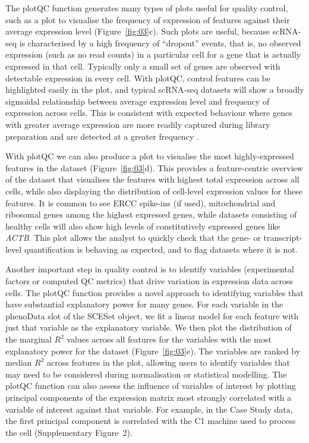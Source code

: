 \documentclass[10pt,letterpaper]{article}
\begin{document}
The plotQC function generates many types of plots useful for quality control,
such as a plot to visualise the frequency of expression of features against their average expression level (Figure~\ref{fig:03}c). Such plots are useful, because scRNA-seq is characterised by a high frequency of ``dropout'' events,
that is, no observed expression (such as no read counts) in a particular
cell for a gene that is actually expressed in that cell. Typically only
a small set of genes are observed with detectable expression in every
cell. With plotQC, control features can be highlighted easily in the plot, and
typical scRNA-seq datasets will show a broadly sigmoidal relationship between
average expression level and frequency of expression across cells. This is
consistent with expected behaviour where genes with greater average expression
are more readily captured during library preparation and are detected at a
greater frequency \citep{Brennecke2013-zv,Kim2015-xd,Vallejos2015-ww}.

With plotQC we can also produce a plot to visualise the most
highly-expressed features in the dataset (Figure~\ref{fig:03}d). This
provides a feature-centric overview of the dataset that visualises the features
with highest total expression across all cells,
while also displaying the distribution of cell-level expression values
for these features. It is common to see ERCC spike-ins (if used),
mitochondrial and ribosomal genes among the highest expressed genes,
while datasets consisting of healthy cells will also show high levels of
constitutively expressed genes like \emph{ACTB}. This
plot allows the analyst to quickly check that the gene- or
transcript-level quantification is behaving as expected, and to flag
datasets where it is not.

Another important step in quality control is to identify variables (experimental factors or computed QC metrics) that drive variation in expression data across cells. The plotQC function
provides a novel approach to identifying variables that
have substantial explanatory power for many genes. For each variable in
the phenoData slot of the SCESet object, we fit a linear model for each
feature with just that variable as the explanatory variable. We then plot the distribution of the marginal $R^2$ values across all features for the variables with the most
explanatory power for the dataset (Figure~\ref{fig:03}e). The variables are ranked by median $R^2$ across features in the plot, allowing users to identify variables that may need to be considered
during normalisation or statistical modelling. The plotQC function can
also assess the influence of variables of interest by plotting principal
components of the expression matrix most strongly correlated with a
variable of interest against that variable. For example, in the Case
Study data, the first principal component is correlated with the
C1 machine used to process the cell (Supplementary Figure~2).
\end{document}
